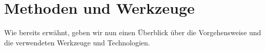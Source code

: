 \section{Methoden und Werkzeuge}
\label{sec:methods-and-tools}

Wie bereits erwähnt, geben wir nun einen Überblick über die Vorgehensweise und die verwendeten Werkzeuge und Technologien.









